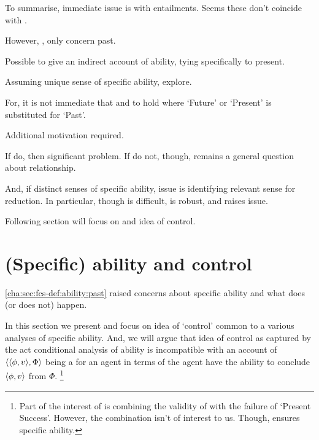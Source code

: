 \begin{note}
  To summarise, immediate issue is with entailments.
  Seems these don't coincide with \fc{}.

  However, \BoyPS{}, \BoyPSC{} only concern past.

  Possible to give an indirect account of ability, tying specifically to present.

  Assuming unique sense of specific ability, explore.

  For, it is not immediate that \BoyPS{} and \BoyPSC{} to hold where `Future' or `Present' is substituted for `Past'.

  Additional motivation required.

  If do, then significant problem.
  If do not, though, remains a general question about relationship.

  And, if distinct senses of specific ability, issue is identifying relevant sense for reduction.
  In particular, though \BoyPS{} is difficult, \BoyPSC{} is robust, and raises issue.

  Following section will focus on \BoyPS{} and idea of control.
\end{note}

\section{(Specific) ability and control}
\label{cha:sec:fcs-def:ability:control-intuition}

\begin{note}[Segue]
  \autoref{cha:sec:fcs-def:ability:past} raised concerns about specific ability and what does (or does not) happen.

  In this section we present and focus on idea of `control' common to a various analyses of specific ability.
  And, we will argue that idea of control as captured by the act conditional analysis of ability is incompatible with an account of \(\langle \langle \phi, v \rangle, \Phi \rangle\) being a  for an agent in terms of the agent have the ability to conclude \(\langle\phi, v\rangle\) from \(\Phi\).%
  \footnote{
    Part of the interest of \textcite{Boylan:2020aa} is combining the validity of \BoyPS{} with the failure of `Present Success'.
    However, the combination isn't of interest to us.
    Though, ensures specific ability.
  }
\end{note}

